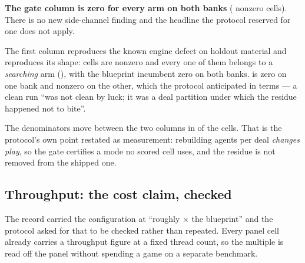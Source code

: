 \begin{table}[t]\centering
\caption{The seat-isolation residual, \vsevenSsixCells{} cells over \vsevenSsixDeals{} audited deals.
The gate column is the preregistered zero-tolerance condition; the first column is the shipped mode.}
\label{tab:residual}
{\small}
\end{table}

\textbf{The gate column is zero for every arm on both banks} (\vsevenSsixGateNonzero{} nonzero cells).
There is no new side-channel finding and the headline the protocol reserved for one does not apply.

The first column reproduces the known engine defect on holdout material and reproduces its shape:
\vsevenSsixPlainNonzero{} cells are nonzero and every one of them belongs to a \emph{searching} arm
(\vsevenSsixAllSearching{}), with the blueprint incumbent zero on both banks. \frozen{} is zero on one
bank and nonzero on the other, which the protocol anticipated in terms --- a clean run ``was not clean
by luck; it was a deal partition under which the residue happened not to bite''.

The denominators move between the two columns in \vsevenSsixDenomMoved{} of the cells. That is the
protocol's own point restated as measurement: rebuilding agents per deal \emph{changes play}, so the
gate certifies a mode no scored cell uses, and the residue is not removed from the shipped one.

\subsection{Throughput: the cost claim, checked}
\label{sec:results-cost}

The record carried the configuration at ``roughly \vsevenCostRecorded$\times$ the blueprint'' and the
protocol asked for that to be checked rather than repeated. Every panel cell already carries a
throughput figure at a fixed thread count, so the multiple is read off the panel without spending a
game on a separate benchmark.

\begin{table}[t]\centering
\caption{Cost relative to the blueprint. Every figure is a \emph{lower bound}: the harness reports
whole-match throughput, which carries the opponent's cost on both sides of the ratio, so the measured
ratio is strictly below the true one. The bound is tightest against the cheapest opponent. No figure
here carries an interval --- these are wall-clock timings taken across a battery that ran over two
days --- and the aggregation is a ratio of medians, which differs from a median of per-bank ratios --- the aggregation the
phase-5 reduction uses --- by at most $\vsevenCostAggDelta\times$ across the six median cells, and
not at all on the \texttt{random} column that carries the claim.}
\label{tab:cost}
{\small}
\end{table}


